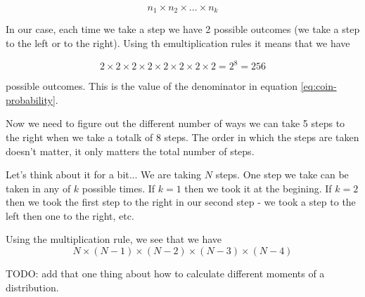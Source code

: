 $$
n_1 \times n_2 \times ... \times n_k
$$

In our case, each time we take a step we have 2 possible outcomes (we take a step to the left or to the right).
Using th emultiplication rules it means that we have

$$
2 \times 2 \times
2 \times 2 \times
2 \times 2 \times
2 \times 2
= 2^8 = 256
$$

possible outcomes.
This is the value of the denominator in equation \eqref{eq:coin-probability}.

Now we need to figure out the different number of ways we can take 5 steps to the right when we take a totalk of 8 steps.
The order in which the steps are taken doesn't matter, it only matters the total number of steps.

Let's think about it for a bit...
We are taking $N$ steps.
One step we take can be taken in any of $k$ possible times.
If $k=1$ then we took it at the begining.
If $k=2$ then we took the first step to the right in our second step - we took a step to the left then one to the right, etc.

Using the multiplication rule, we see that we have 
$$
N \times 
\left( N-1 \right) \times
\left( N-2 \right) \times 
\left( N-3 \right) \times
\left( N-4 \right)
$$


TODO: add that one thing about how to calculate different moments of a distribution.\cite{reiff}